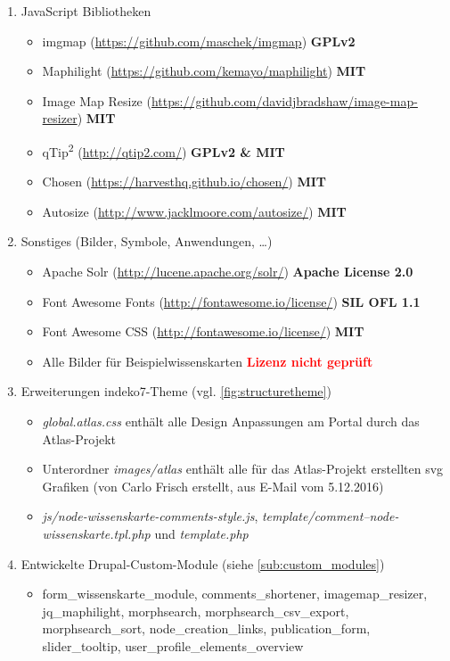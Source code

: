 \begin{enumerate}[parsep=0pt, itemsep=5.0pt plus 2.0pt minus 1.0pt, leftmargin=*]
	\item JavaScript Bibliotheken
	\begin{itemize}
		\item imgmap (\url{https://github.com/maschek/imgmap})  \textbf{GPLv2}
		\item Maphilight (\url{https://github.com/kemayo/maphilight}) \textbf{MIT}
		\item Image Map Resize (\url{https://github.com/davidjbradshaw/image-map-resizer}) \textbf{MIT}
		\item qTip\textsuperscript{2} (\url{http://qtip2.com/}) \textbf{GPLv2 \& MIT}
		\item Chosen (\url{https://harvesthq.github.io/chosen/}) \textbf{MIT}
		\item Autosize (\url{http://www.jacklmoore.com/autosize/}) \textbf{MIT}
	\end{itemize}

	\item Sonstiges (Bilder, Symbole, Anwendungen, \dots\label{sub:license_images})
	\begin{itemize}
		\item Apache Solr (\url{http://lucene.apache.org/solr/}) \textbf{Apache License 2.0}
		\item Font Awesome Fonts (\url{http://fontawesome.io/license/}) \textbf{SIL OFL 1.1}
		\item Font Awesome CSS (\url{http://fontawesome.io/license/}) \textbf{MIT}
		\item Alle Bilder für Beispielwissenskarten \textcolor{red}{\textbf{Lizenz nicht geprüft}}
	\end{itemize}

	\item Erweiterungen indeko7-Theme (vgl. \cref{fig:structuretheme})
	\begin{itemize}
		\item \textit{global.atlas.css} enthält alle Design Anpassungen am Portal durch das Atlas-Projekt
		\item Unterordner \textit{images/atlas} enthält alle für das Atlas-Projekt erstellten svg Grafiken (von Carlo Frisch erstellt, aus E-Mail vom 5.12.2016)
		\item \textit{js/node-wissenskarte-comments-style.js}, \textit{template/comment--node-wissenskarte.tpl.php} und \textit{template.php}
	\end{itemize}

	\item Entwickelte Drupal-Custom-Module (siehe \cref{sub:custom_modules})
	\begin{itemize}
		\item form\_wissenskarte\_module, comments\_shortener, imagemap\_resizer, jq\_maphilight, morphsearch, morphsearch\_csv\_export, morphsearch\_sort, node\_creation\_links, publication\_form, slider\_tooltip, user\_profile\_elements\_overview
	\end{itemize}
\end{enumerate}


